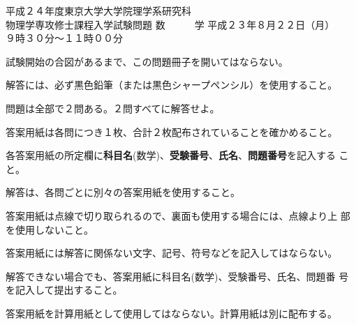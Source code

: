\begin{inshicover}%
  {平成２４年度東京大学大学院理学系研究科\\物理学専攻修士課程入学試験問題}%
  {数　　　学}%
  {平成２３年８月２２日（月）　　９時３０分〜１１時００分}
\item 試験開始の合図があるまで、この問題冊子を開いてはならない。
\item 解答には、必ず黒色鉛筆（または黒色シャープペンシル）を使用すること。
\item 問題は全部で２問ある。２問すべてに解答せよ。
\item 答案用紙は各問につき１枚、合計２枚配布されていることを確かめること。
\item 各答案用紙の所定欄に{\bf 科目名}(数学)、{\bf 受験番号}、{\bf 氏名}、{\bf 問題番号}を記入する
      こと。
\item 解答は、各問ごとに別々の答案用紙を使用すること。
\item 答案用紙は点線で切り取られるので、裏面も使用する場合には、点線より上
      部を使用しないこと。
\item 答案用紙には解答に関係ない文字、記号、符号などを記入してはならない。
\item 解答できない場合でも、答案用紙に科目名(数学)、受験番号、氏名、問題番
      号を記入して提出すること。
\item 答案用紙を計算用紙として使用してはならない。計算用紙は別に配布する。
\end{inshicover}
